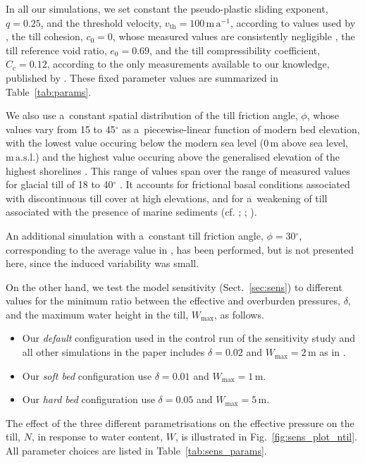 \documentclass{article}
\newcommand{\unit}[1]{\ensuremath{\mathrm{#1}}}
\newcommand{\degree}[0]{\ensuremath{^{\circ}}}
\begin{document}
      In all our simulations, we set constant the pseudo-plastic sliding
      exponent, $q=0.25$, and the threshold velocity,
      $v_{\text{th}}=100$\,\unit{m\,a^{-1}}, according to values used by
      \citet{Aschwanden.etal.2013}, the till cohesion, $c_0=0$, whose
      measured values are consistently negligible
      \citep[p.~268]{Tulaczyk.etal.2000, Cuffey.Paterson.2010}, the till
      reference void ratio, $e_0=0.69$, and the till compressibility
      coefficient, $C_{\mathrm{c}}=0.12$, according to the only measurements
      available to our knowledge, published by \citet{Tulaczyk.etal.2000}.
      These fixed parameter values are summarized in Table~\ref{tab:params}.

      We also use a~constant spatial distribution of the till friction
      angle, $\phi$, whose values vary from 15 to 45\unit{\degree} as
      a~piecewise-linear function of modern bed elevation, with the lowest
      value occuring below the modern sea level (0\,\unit{m} above sea level,
      \unit{m\,a.s.l.}) and the highest value occuring above the generalised
      elevation of the highest shorelines
      \citep[200\,\unit{m\,a.s.l.},][Fig.~5]{Clague.1981}. This range of
      values span over the range of measured values for glacial till of 18
      to 40\unit{\degree} \citep[p.~268]{Cuffey.Paterson.2010}. It accounts
      for frictional basal conditions associated with discontinuous till
      cover at high elevations, and for a~weakening of till associated with
      the presence of marine sediments (cf. \citealp{Martin.etal.2011};
      \citealp[Supplement]{Aschwanden.etal.2013};
      \citealp{PISM-authors.2017}).

      An additional simulation with a~constant till friction angle,
      $\phi=30$\unit{\degree}, corresponding to the average value in
      \citet[p.~268]{Cuffey.Paterson.2010}, has been performed, but is not
      presented here, since the induced variability was small.

      On the other hand, we test the model sensitivity
      (Sect.~\ref{sec:sens}) to different values for the minimum ratio
      between the effective and overburden pressures, $\delta$, and the
      maximum water height in the till, $W_{\text{max}}$, as follows.
%
\begin{itemize}
  \item Our \emph{default} configuration used in the control run of the
    sensitivity study and all other simulations in the paper includes
    $\delta=0.02$ and $W_{\text{max}}=2$\,\unit{m} as in
    \citet{Bueler.Pelt.2015}.
  \item Our \emph{soft bed} configuration use $\delta=0.01$ and
    $W_{\text{max}}=1$\,\unit{m}.
  \item Our \emph{hard bed} configuration use $\delta=0.05$ and
    $W_{\text{max}}=5$\,\unit{m}.
\end{itemize}
%
      The effect of the three different parametrisations on the effective
      pressure on the till, $N$, in response to water content, $W$, is
      illustrated in Fig.~\ref{fig:sens_plot_ntil}. All parameter choices
      are listed in Table~\ref{tab:sens_params}.
\end{document}
